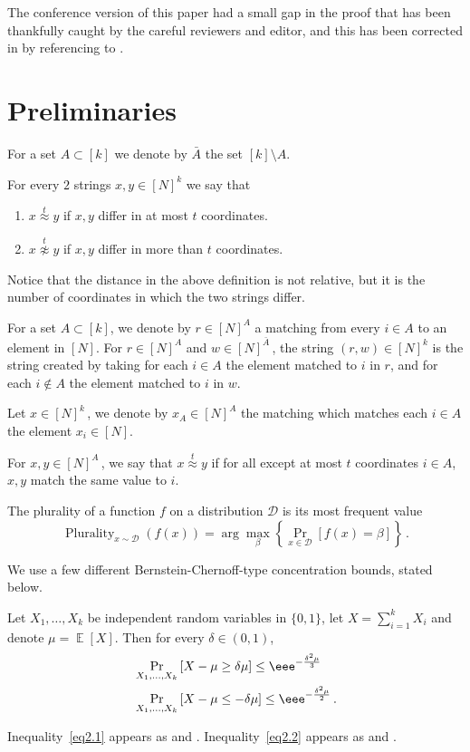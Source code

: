 \documentclass{toc}
\newcommand{\Prob}[2][]{\Pr_{{#1}}\left[#2\right]} %
\DeclareMathOperator*{\E}{\mathbb{E}} %
\newcommand\neql[1]{\stackrel{{#1}}{ \approx}} %
\newcommand\neqg[1]{\stackrel{{#1}}{ \not\approx}} %
\DeclareMathOperator*\plur{\mathrm{Plurality}} %
\newcommand\rest[1]{{\bar{#1}}}  %
\begin{document}
%
The conference version of this paper had a small gap in the proof that 
has been thankfully caught by the careful reviewers and editor, and 
this has been corrected in  by 
referencing to \cite{IK10}.

\section{Preliminaries}\label{sec:notations}
For a set $A\subset[k]$ we denote by $\rest{A}$ the set $[k]\setminus A$.
\begin{definition}
	For every $2$ strings $x,y\in [N]^k$ we say that
	\begin{enumerate}
		\item {$x\neql{t} y$ if $x,y$ differ in at most $t$ coordinates.}
		\item {$x\neqg{t} y$ if $x,y$ differ in more than $t$ coordinates. }
	\end{enumerate}
\end{definition}
Notice that the distance in the above definition is not relative, but it is the number of coordinates in which the two strings differ.	

For a set $A\subset[k]$, we denote by $r\in[N]^A$ a matching from every $i\in A$ to an element in $[N]$. For $r\in[N]^A$ and $w\in [N]^{\rest{A}}$\,, the string $(r,w)\in [N]^k$ is the string created by taking for each $i\in A$ the element matched to $i$ in $r$, and for each $i\notin A$ the element matched to $i$ in $w$.

Let $x\in [N]^k$\,, we denote by $x_A\in [N]^A$ the matching which matches each $i\in A$ the element $x_i\in [N]$.

For $x,y\in [N]^A$\,, we say that $x\neql{t} y$ if for all except at most $t$ coordinates $i\in A$, $x,y$ match the same value to $i$.

\begin{definition}[Plurality]
	The plurality of a function $f$ on a distribution $\mathcal{D}$ is its most frequent value \[\plur_{x\sim\mathcal{D}}(f(x)) = \arg\max_{\beta}\left\{\Prob[x\in\mathcal{D}]{f(x) = \beta}\right\}\,.\] %
\end{definition}

%
We  %
use a few different %
Bernstein-Chernoff-type concentration bounds, stated below.
 
%
%
\begin{fact}\label{fact:Chernoff}
	Let $X_1,\ldots, X_k$ be independent random variables in $\{0,1\}$, let $X=\sum_{i=1}^k X_i$ and denote $\mu=\E[X]$. Then for every $\delta\in(0,1)$,
\begin{align} %
%
&\Prob[X_1,\ldots, X_k]{X -\mu\geq \delta\mu}\leq \eee^{-\frac{\delta^2\mu}{3}}
  \label{eq2.1} \\ %
&\Prob[X_1,\ldots, X_k]{X -\mu\leq -\delta\mu}\leq \eee^{-\frac{\delta^2\mu}{2}}\,. \label{eq2.2} %
\end{align}  %
\end{fact}	
%
%
%
Inequality~\eqref{eq2.1} appears as \cite[Eq. (6)]{hagerup1990guided}
and \cite[Thm. 4.4.2]{MU2005}.  Inequality~\eqref{eq2.2} appears as
\cite[Eq. (7)]{hagerup1990guided} and \cite[Thm. 4.5.2]{MU2005}.  %
\end{document}

